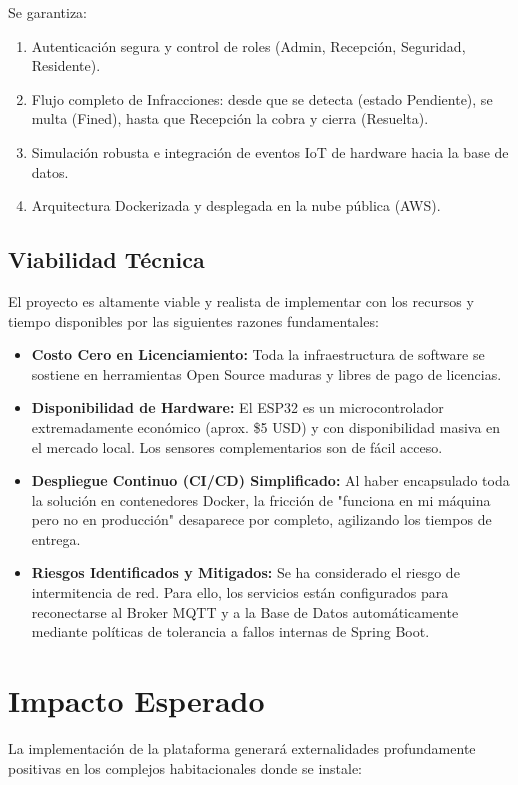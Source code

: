 \documentclass[12pt,a4paper]{article}
\begin{document}
Se garantiza:
\begin{enumerate}
    \item Autenticación segura y control de roles (Admin, Recepción, Seguridad, Residente).
    \item Flujo completo de Infracciones: desde que se detecta (estado Pendiente), se multa (Fined), hasta que Recepción la cobra y cierra (Resuelta).
    \item Simulación robusta e integración de eventos IoT de hardware hacia la base de datos.
    \item Arquitectura Dockerizada y desplegada en la nube pública (AWS).
\end{enumerate}

\subsection{Viabilidad Técnica}
El proyecto es altamente viable y realista de implementar con los recursos y tiempo disponibles por las siguientes razones fundamentales:
\begin{itemize}
    \item \textbf{Costo Cero en Licenciamiento:} Toda la infraestructura de software se sostiene en herramientas Open Source maduras y libres de pago de licencias.
    \item \textbf{Disponibilidad de Hardware:} El ESP32 es un microcontrolador extremadamente económico (aprox. \$5 USD) y con disponibilidad masiva en el mercado local. Los sensores complementarios son de fácil acceso.
    \item \textbf{Despliegue Continuo (CI/CD) Simplificado:} Al haber encapsulado toda la solución en contenedores Docker, la fricción de "funciona en mi máquina pero no en producción" desaparece por completo, agilizando los tiempos de entrega.
    \item \textbf{Riesgos Identificados y Mitigados:} Se ha considerado el riesgo de intermitencia de red. Para ello, los servicios están configurados para reconectarse al Broker MQTT y a la Base de Datos automáticamente mediante políticas de tolerancia a fallos internas de Spring Boot.
\end{itemize}

\section{Impacto Esperado}
La implementación de la plataforma generará externalidades profundamente positivas en los complejos habitacionales donde se instale:
\end{document}
